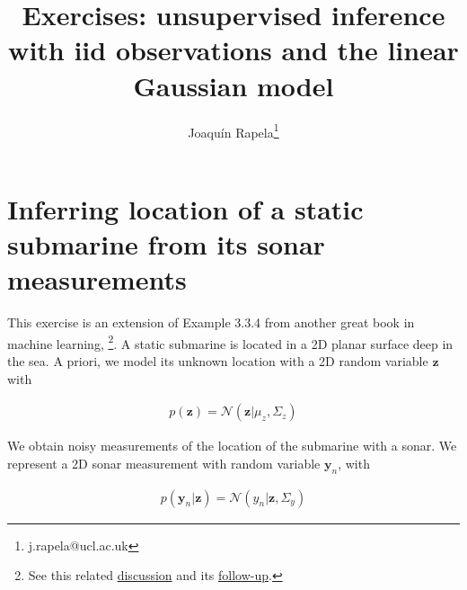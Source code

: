 \documentclass[12pt]{article}
\begin{document}
\title{Exercises: unsupervised inference with iid observations and the linear Gaussian model}
\author{Joaqu\'{i}n Rapela\thanks{j.rapela@ucl.ac.uk}}

\maketitle

\section{Inferring location of a static submarine from its sonar
measurements}

This exercise is an extension of Example 3.3.4 from
another great book in machine learning, \citet{murphyIntro22}\footnote{See this related
\href{https://github.com/probml/pml-book/issues/510}{discussion} and its
\href{https://github.com/probml/pml-book/issues/512}{follow-up}.}.
%
A static submarine is located in a 2D planar surface deep in the sea. A
priori, we model its unknown location with a 2D random variable
$\mathbf{z}$ with 

\begin{align}
    p(\mathbf{z})=\mathcal{N}\left(\mathbf{z}|\mu_z,\Sigma_z\right)
\end{align}

We obtain noisy measurements of the location of the submarine with a sonar.
We represent a 2D sonar measurement with random variable $\mathbf{y}_n$,
with 

\begin{align}
    p(\mathbf{y}_n|\mathbf{z})=\mathcal{N}(y_n|\mathbf{z}, \Sigma_y)
\end{align}
\end{document}
